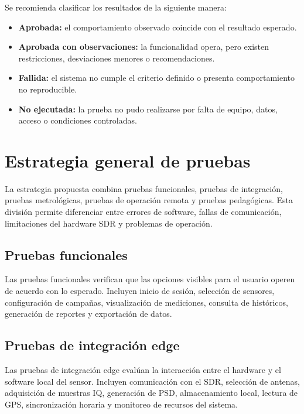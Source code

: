 Se recomienda clasificar los resultados de la siguiente manera:

\begin{itemize}
    \item \textbf{Aprobada:} el comportamiento observado coincide con el resultado esperado.
    \item \textbf{Aprobada con observaciones:} la funcionalidad opera, pero existen restricciones, desviaciones menores o recomendaciones.
    \item \textbf{Fallida:} el sistema no cumple el criterio definido o presenta comportamiento no reproducible.
    \item \textbf{No ejecutada:} la prueba no pudo realizarse por falta de equipo, datos, acceso o condiciones controladas.
\end{itemize}

\section{Estrategia general de pruebas}

La estrategia propuesta combina pruebas funcionales, pruebas de integración, pruebas metrológicas, pruebas de operación remota y pruebas pedagógicas. Esta división permite diferenciar entre errores de software, fallas de comunicación, limitaciones del hardware SDR y problemas de operación.

\subsection{Pruebas funcionales}

Las pruebas funcionales verifican que las opciones visibles para el usuario operen de acuerdo con lo esperado. Incluyen inicio de sesión, selección de sensores, configuración de campañas, visualización de mediciones, consulta de históricos, generación de reportes y exportación de datos.

\subsection{Pruebas de integración edge}

Las pruebas de integración edge evalúan la interacción entre el hardware y el software local del sensor. Incluyen comunicación con el SDR, selección de antenas, adquisición de muestras IQ, generación de PSD, almacenamiento local, lectura de GPS, sincronización horaria y monitoreo de recursos del sistema.

